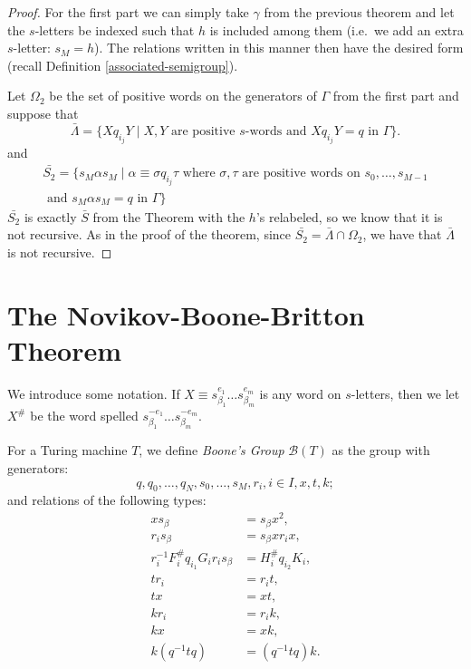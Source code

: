 \begin{proof}
  For the first part we can simply take $\gamma$ from the previous theorem and let the $s$-letters be indexed such that $h$ is included among them (i.e.\ we add an extra $s$-letter: $s_M = h$). The relations written in this manner then have the desired form (recall Definition \ref{associated-semigroup}).

  Let $\Omega_2$ be the set of positive words on the generators of $\Gamma$ from the first part and suppose that
  \begin{equation*}
    \bar{\Lambda} = \{Xq_{i_j}Y  \mid X,Y \text{ are positive }s\text{-words and } Xq_{i_j}Y = q \text{ in } \Gamma\}.
  \end{equation*}
  and 
  \begin{gather*}
    \bar{S_2} = \{s_M\alpha s_M \mid \alpha \equiv \sigma q_{i_j} \tau \text{ where } \sigma,\tau \text{ are positive words on } s_0,\dots,s_{M-1} \\
    \text{ and } s_M\alpha s_M = q \text{ in } \Gamma\}
  \end{gather*}
  $\bar{S_2}$ is exactly $\bar{S}$ from the Theorem with the $h$'s relabeled, so we know that it is not recursive. As in the proof of the theorem, since $\bar{S_2} = \bar{\Lambda} \cap \Omega_2$, we have that $\bar{\Lambda}$ is not recursive.
\end{proof}

\section{The Novikov-Boone-Britton Theorem}


We introduce some notation. If $X \equiv s_{\beta_1}^{e_1} \dots s_{\beta_m}^{e_m}$ is any word on $s$-letters, then we let $X^{\#}$ be the word spelled $s_{\beta_1}^{-e_1} \dots s_{\beta_m}^{-e_m}$.

\begin{definition}
  For a Turing machine $T$, we define \emph{Boone's Group} $\mathcal{B}(T)$ as the group with generators:
  \begin{equation*}
    q,q_0, \dots, q_N, s_0, \dots, s_M, r_i, i \in I,x,t,k;
  \end{equation*}
  and relations of the following types:
  \begin{align*}
    xs_\beta &= s_\beta x^2, \\
    r_is_\beta &= s_\beta xr_ix, \\
    r_i^{-1}F_i^{\#}q_{i_1}G_ir_is_\beta &= H_i^{\#}q_{i_2}K_i, \\
    tr_i &= r_it, \\
    tx &= xt, \\
    kr_i &= r_ik, \\
    kx &= xk, \\
    k(q^{-1}tq) &= (q^{-1}tq)k.    
  \end{align*}
\end{definition}

